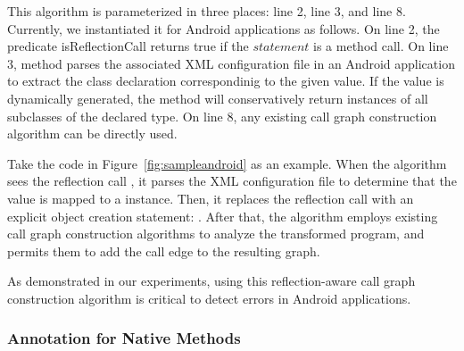 This algorithm is parameterized in three places:
line 2, line 3, and line 8. Currently, we instantiated it
for Android applications as follows. On line 2,
the predicate isReflectionCall returns true
if the $statement$ is a  method call. On line 3, method
 parses the associated XML configuration
file in an Android application to extract the class declaration
 correspondinig to the given  value. If the 
value is dynamically generated, the method will conservatively
return instances of all subclasses of the declared type.
On line 8, any existing call graph construction algorithm can be directly
used.

Take the code in Figure~\ref{fig:sampleandroid} as an example.
When the algorithm sees the reflection call
, it
parses the XML configuration file to determine that the 
value is mapped to a  instance. Then, it
replaces the reflection call
with an explicit object creation statement: .
After that, the algorithm employs existing call graph construction
algorithms to analyze the transformed program, and permits them
to add the call edge  to the resulting graph.

As demonstrated in our experiments, using this reflection-aware call
graph construction algorithm is critical to detect errors
in Android applications.



\subsubsection{Annotation for Native Methods}
\label{sec:annotation}

